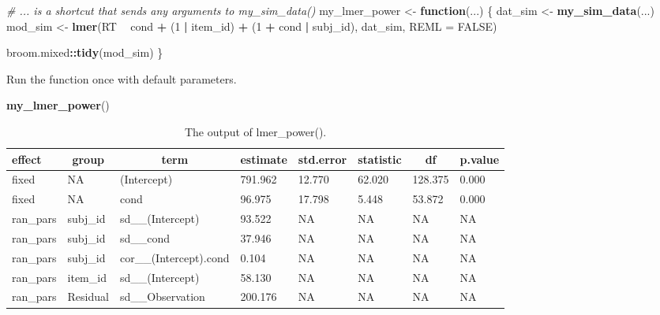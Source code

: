 \documentclass[man,floatsintext]{apa6}
\newenvironment{Shaded}{\begin{snugshade}}{\end{snugshade}}
\newcommand{\KeywordTok}[1]{\textcolor[rgb]{0.13,0.29,0.53}{\textbf{#1}}}
\newcommand{\DataTypeTok}[1]{\textcolor[rgb]{0.13,0.29,0.53}{#1}}
\newcommand{\DecValTok}[1]{\textcolor[rgb]{0.00,0.00,0.81}{#1}}
\newcommand{\StringTok}[1]{\textcolor[rgb]{0.31,0.60,0.02}{#1}}
\newcommand{\CommentTok}[1]{\textcolor[rgb]{0.56,0.35,0.01}{\textit{#1}}}
\newcommand{\OtherTok}[1]{\textcolor[rgb]{0.56,0.35,0.01}{#1}}
\newcommand{\ControlFlowTok}[1]{\textcolor[rgb]{0.13,0.29,0.53}{\textbf{#1}}}
\newcommand{\OperatorTok}[1]{\textcolor[rgb]{0.81,0.36,0.00}{\textbf{#1}}}
\newcommand{\NormalTok}[1]{#1}
\begin{document}
\begin{Shaded}
\begin{Highlighting}[]
\CommentTok{# ... is a shortcut that sends any arguments to my_sim_data()}
\NormalTok{my_lmer_power <-}\StringTok{ }\ControlFlowTok{function}\NormalTok{(...) \{}
\NormalTok{  dat_sim <-}\StringTok{ }\KeywordTok{my_sim_data}\NormalTok{(...)}
\NormalTok{  mod_sim <-}\StringTok{ }\KeywordTok{lmer}\NormalTok{(RT }\OperatorTok{~}\StringTok{ }\NormalTok{cond }\OperatorTok{+}\StringTok{ }\NormalTok{(}\DecValTok{1} \OperatorTok{|}\StringTok{ }\NormalTok{item_id) }\OperatorTok{+}\StringTok{ }\NormalTok{(}\DecValTok{1} \OperatorTok{+}\StringTok{ }\NormalTok{cond }\OperatorTok{|}\StringTok{ }\NormalTok{subj_id),}
\NormalTok{                dat_sim, }\DataTypeTok{REML =} \OtherTok{FALSE}\NormalTok{)}
  
\NormalTok{  broom.mixed}\OperatorTok{::}\KeywordTok{tidy}\NormalTok{(mod_sim)}
\NormalTok{\}}
\end{Highlighting}
\end{Shaded}

Run the function once with default parameters.

\begin{Shaded}
\begin{Highlighting}[]
\KeywordTok{my_lmer_power}\NormalTok{()}
\end{Highlighting}
\end{Shaded}

\begin{table}[tbp]
\begin{center}
\begin{threeparttable}
\caption{\label{tab:unnamed-chunk-13}The output of lmer\_power().}
\begin{tabular}{llllllll}
\toprule
effect & \multicolumn{1}{c}{group} & \multicolumn{1}{c}{term} & \multicolumn{1}{c}{estimate} & \multicolumn{1}{c}{std.error} & \multicolumn{1}{c}{statistic} & \multicolumn{1}{c}{df} & \multicolumn{1}{c}{p.value}\\
\midrule
fixed & NA & (Intercept) & 791.962 & 12.770 & 62.020 & 128.375 & 0.000\\
fixed & NA & cond & 96.975 & 17.798 & 5.448 & 53.872 & 0.000\\
ran\_pars & subj\_id & sd\_\_(Intercept) & 93.522 & NA & NA & NA & NA\\
ran\_pars & subj\_id & sd\_\_cond & 37.946 & NA & NA & NA & NA\\
ran\_pars & subj\_id & cor\_\_(Intercept).cond & 0.104 & NA & NA & NA & NA\\
ran\_pars & item\_id & sd\_\_(Intercept) & 58.130 & NA & NA & NA & NA\\
ran\_pars & Residual & sd\_\_Observation & 200.176 & NA & NA & NA & NA\\
\bottomrule
\end{tabular}
\end{threeparttable}
\end{center}
\end{table}
\end{document}
